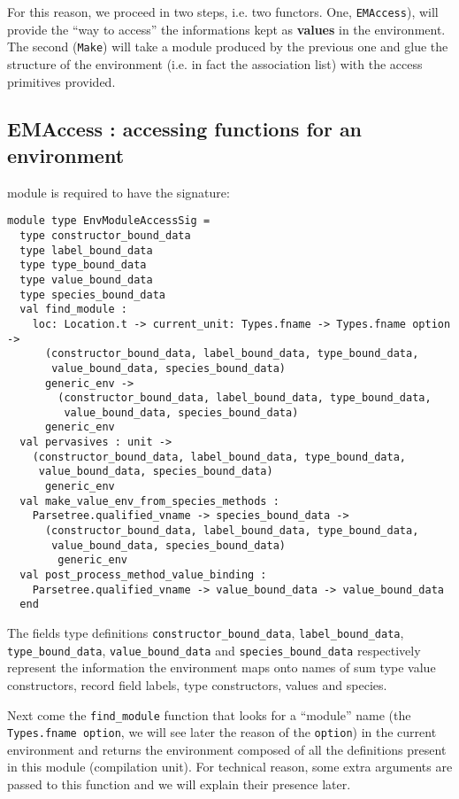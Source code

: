 For this reason, we proceed in two steps, i.e. two functors. One,
{\tt EMAccess}), will provide the ``way to access'' the informations
kept as {\bf values} in the environment. The second ({\tt Make}) will
take a module produced by the previous one and glue the structure of
the environment (i.e. in fact the association list) with the access
primitives provided.



\subsection{EMAccess : accessing functions for an environment}
module is required to have the signature:
{\scriptsize
\begin{lstlisting}[language=MyOCaml]
module type EnvModuleAccessSig =
  type constructor_bound_data
  type label_bound_data
  type type_bound_data
  type value_bound_data
  type species_bound_data
  val find_module :
    loc: Location.t -> current_unit: Types.fname -> Types.fname option ->
      (constructor_bound_data, label_bound_data, type_bound_data,
       value_bound_data, species_bound_data)
      generic_env ->
        (constructor_bound_data, label_bound_data, type_bound_data,
         value_bound_data, species_bound_data)
      generic_env
  val pervasives : unit ->
    (constructor_bound_data, label_bound_data, type_bound_data,
     value_bound_data, species_bound_data)
      generic_env
  val make_value_env_from_species_methods :
    Parsetree.qualified_vname -> species_bound_data ->
      (constructor_bound_data, label_bound_data, type_bound_data,
       value_bound_data, species_bound_data)
        generic_env
  val post_process_method_value_binding :
    Parsetree.qualified_vname -> value_bound_data -> value_bound_data
  end
\end{lstlisting}
}

The fields type definitions {\tt constructor\_bound\_data},
{\tt label\_bound\_data}, {\tt type\_bound\_data}, {\tt value\_bound\_data}
and {\tt species\_bound\_data} respectively represent the information the
environment maps onto names of sum type value constructors, record
field labels, type constructors, values and species.

Next come the {\tt find\_module} function that looks for a ``module''
name (the {\tt Types.fname option}, we will see later the reason of
the {\tt option}) in the current environment and returns the
environment composed of all the definitions present in this module
(compilation unit). For technical reason, some extra arguments are
passed to this function and we will explain their presence later.

